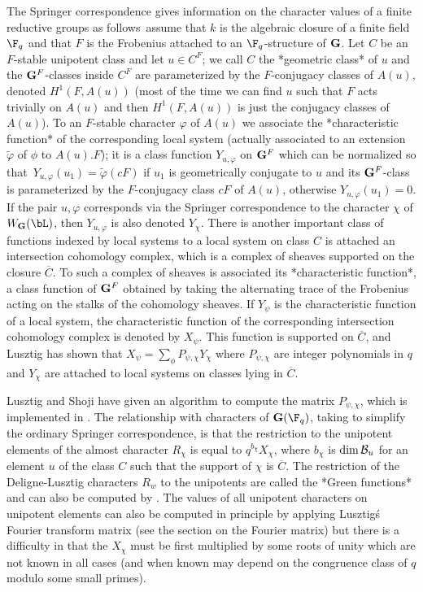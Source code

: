 The  Springer correspondence gives information on the character values of a
finite  reductive groups  as follows\:\  assume that  $k$ is  the algebraic
closure  of a finite field $\F_q$ and that $F$ is the Frobenius attached to
an  $\F_q$-structure of ${\bf G}$. Let $C$ be an $F$-stable unipotent class and
let  $u\in  C^F$;  we  call  $C$  the  *geometric  class*  of  $u$  and the
${\bf G}^F$-classes inside $C^F$ are parameterized by the $F$-conjugacy classes
of  $A(u)$, denoted $H^1(F,A(u))$  (most of the  time we can  find $u$ such
that  $F$  acts  trivially  on  $A(u)$  and  then $H^1(F,A(u))$ is just the
conjugacy  classes  of  $A(u)$).  To  an  $F$-stable character $\varphi$ of
$A(u)$  we  associate  the  *characteristic  function* of the corresponding
local system (actually associated to an extension $\tilde\varphi$ of $\phi$
to  $A(u).F$); it is a class  function $Y_{u,\varphi}$ on ${\bf G}^F$ which can
be normalized so that\:\ $Y_{u,\varphi}(u_1)=\tilde\varphi(cF)$ if $u_1$ is
geometrically  conjugate to $u$  and its ${\bf G}^F$-class  is parameterized by
the  $F$-conjugacy class $cF$  of $A(u)$, otherwise $Y_{u,\varphi}(u_1)=0$.
If  the pair $u,\varphi$ corresponds via the Springer correspondence to the
character  $\chi$  of  $W_\bG(\bL)$,  then  $Y_{u,\varphi}$ is also denoted
$Y_\chi$.  There is another  important class of  functions indexed by local
systems\:  to  a  local  system  on  class  $C$ is attached an intersection
cohomology  complex, which is a complex of sheaves supported on the closure
$\overline   C$.  To   such  a   complex  of   sheaves  is  associated  its
*characteristic  function*, a class function  of ${\bf G}^F$ obtained by taking
the  alternating  trace  of  the  Frobenius  acting  on  the  stalks of the
cohomology  sheaves. If $Y_\psi$ is the  characteristic function of a local
system,  the  characteristic  function  of  the  corresponding intersection
cohomology  complex is denoted  by $X_\psi$. This  function is supported on
$\overline  C$, and Lusztig has  shown that $X_\psi=\sum_\phi P_{\psi,\chi}
Y_\chi$  where $P_{\psi,\chi}$ are integer  polynomials in $q$ and $Y_\chi$
are attached to local systems on classes lying in $\overline C$.

Lusztig   and  Shoji  have  given  an   algorithm  to  compute  the  matrix
$P_{\psi,\chi}$,  which is  implemented in  \CHEVIE. The  relationship with
characters  of  $\bG(\F_q)$,  taking  to  simplify  the  ordinary  Springer
correspondence,  is that the  restriction to the  unipotent elements of the
almost  character $R_\chi$ is equal  to $q^{b_\chi} X_\chi$, where $b_\chi$
is  $\dim {\mathcal B}_u$ for an element $u$ of  the class $C$ such that the support
of  $\chi$  is  $\overline  C$.  The  restriction  of  the  Deligne-Lusztig
characters $R_w$ to the unipotents are called the *Green functions* and can
also  be computed  by \CHEVIE.  The values  of all  unipotent characters on
unipotent elements can also be computed in principle by applying Lusztig\'s
Fourier  transform matrix (see the section on the Fourier matrix) but there
is a difficulty in that the $X_\chi$ must be first multiplied by some roots
of unity which are not known in all cases (and when known may depend on the
congruence class of $q$ modulo some small primes).

